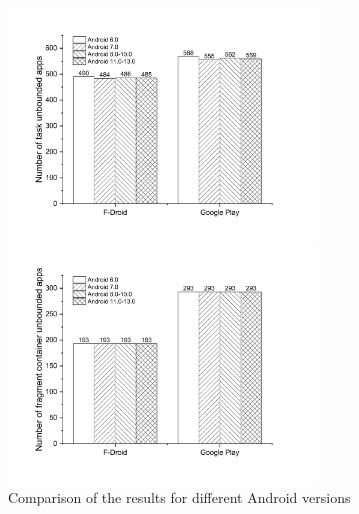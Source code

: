 \begin{figure}[htbp]
	\begin{minipage}[t]{0.49\linewidth}
		\centering
		\includegraphics[width=3.2in]{cmp-and-task.pdf}
	\end{minipage}
	\begin{minipage}[t]{0.49\linewidth}
		\centering
		\includegraphics[width=3.2in]{cmp-and-frag.pdf}
	\end{minipage}
	\caption{Comparison of the results for different Android versions}
	\label{fig:cmp-and}
\end{figure}

